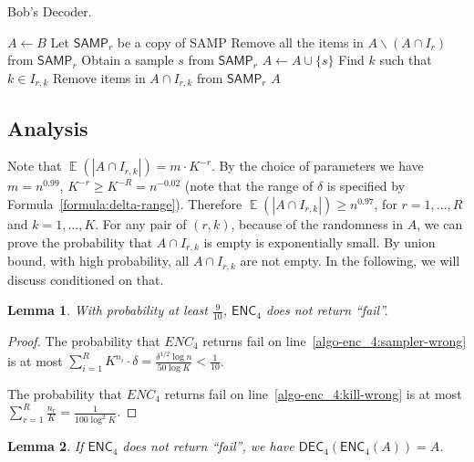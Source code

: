 \documentclass[10pt]{article}
\DeclareMathOperator*{\E}{\mathbb{E}}
\newtheorem{lemma}{Lemma}
\newcommand{\samp}{\textsf{SAMP}\xspace}
\newcommand{\enc}{\textsf{ENC}\xspace}
\newcommand{\dec}{\textsf{DEC}\xspace}
\begin{document}
\begin{algorithm}[H]
  \caption{Bob's Decoder.}
  \begin{algorithmic}[1]
    \Procedure{$\dec_4$}{\samp, $B$}
    \State $A\leftarrow B$
      \State Let $\samp_r$ be a copy of \samp 
      \State Remove all the items in $A\backslash (A\cap I_r)$ from $\samp_r$
      \State Obtain a sample $s$ from $\samp_r$
      \State $A\leftarrow A \cup \{s\}$
      \State Find $k$ such that $k\in I_{r,k}$
      \State Remove items in $A\cap I_{r,k}$ from $\samp_r$
      \EndFor
    \EndFor
    \State \Return $A$ 
    \EndProcedure
  \end{algorithmic}
\end{algorithm}

\subsection{Analysis} 

Note that $\E(|A\cap I_{r,k}|)=m\cdot K^{-r}$. By the choice of parameters we have $m=n^{0.99}$, $K^{-r}\ge K^{-R}=n^{-0.02}$ (note that the range of $\delta$ is specified by Formula~\ref{formula:delta-range}). Therefore $\E(|A\cap I_{r,k}|) \ge n^{0.97}$, for $r=1,\ldots, R$ and $k=1,\ldots, K$. For any pair of $(r,k)$, because of the randomness in $A$, we can prove the probability that $A\cap I_{r,k}$ is empty is exponentially small. By union bound, with high probability, all $A\cap I_{r,k}$ are not empty. In the following, we will discuss conditioned on that.

\begin{lemma} \label{lemma:enc_4-sampler-work}
  With probability at least $\frac{9}{10}$, $\enc_4$ does not return ``fail''. 
\end{lemma}

\begin{proof}
  The probability that $ENC_4$ returns fail on line~\ref{algo-enc_4:sampler-wrong} is at most $\sum_{i=1}^{R} K^{n_i}\cdot \delta = \frac{\delta^{1/2} \log n}{50\log K} < \frac{1}{10}$. 
  
  The probability that $ENC_4$ returns fail on line~\ref{algo-enc_4:kill-wrong} is at most $\sum_{r=1}^{R}{\frac{n_r}{K}}=\frac{1}{100\log^2 K}$.
  
\end{proof}

\begin{lemma}
  If $\enc_4$ does not return ``fail'', we have $\dec_4(\enc_4(A))=A$.
\end{lemma}
\end{document}
